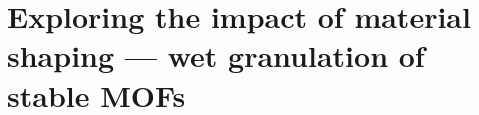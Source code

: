 
\graphicspath{ {\thisch/figures/} }

\chapter{Exploring the impact of material shaping --- wet granulation of stable MOFs}%
\label{shaping}








